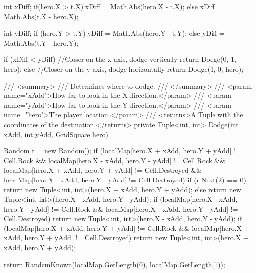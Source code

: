 \documentclass[11pt]{article}
\begin{document}
\begin{code}
{{{            int xDiff;
            if(hero.X > t.X)
                xDiff = Math.Abs(hero.X - t.X);
            else
                xDiff = Math.Abs(t.X - hero.X);
            
            int yDiff;
            if (hero.Y > t.Y)
                yDiff = Math.Abs(hero.Y - t.Y);
            else
                yDiff = Math.Abs(t.Y - hero.Y);

            if (xDiff < yDiff)          //Closer on the x-axis, dodge vertically
                return Dodge(0, 1, hero);
            else                        //Closer on the y-axis, dodge horizontally
                return Dodge(1, 0, hero);
        }

        /// <summary>
        /// Determines where to dodge.
        /// </summary>
        /// <param name="xAdd">How far to look in the X-direction.</param>
        /// <param name="yAdd">How far to look in the Y-direction.</param>
        /// <param name="hero">The player location.</param>
        /// <returns>A Tuple with the coordinates of the destination.</returns>
        private Tuple<int, int> Dodge(int xAdd, int yAdd, GridSquare hero)
        {
            Random r = new Random();
            if (localMap[hero.X + xAdd, hero.Y + yAdd] != Cell.Rock && localMap[hero.X - xAdd, hero.Y - yAdd] != Cell.Rock && localMap[hero.X + xAdd, hero.Y + yAdd] != Cell.Destroyed && localMap[hero.X - xAdd, hero.Y - yAdd] != Cell.Destroyed)
            {
                if (r.Next(2) == 0)
                    return new Tuple<int, int>(hero.X + xAdd, hero.Y + yAdd);
                else
                    return new Tuple<int, int>(hero.X - xAdd, hero.Y - yAdd);
            }
            if (localMap[hero.X - xAdd, hero.Y - yAdd] != Cell.Rock && localMap[hero.X - xAdd, hero.Y - yAdd] != Cell.Destroyed)
                return new Tuple<int, int>(hero.X - xAdd, hero.Y - yAdd);
            if (localMap[hero.X + xAdd, hero.Y + yAdd] != Cell.Rock && localMap[hero.X + xAdd, hero.Y + yAdd] != Cell.Destroyed)
                return new Tuple<int, int>(hero.X + xAdd, hero.Y + yAdd);

            return RandomKnown(localMap.GetLength(0), localMap.GetLength(1));
        }

}}
\end{code}
\end{document}
